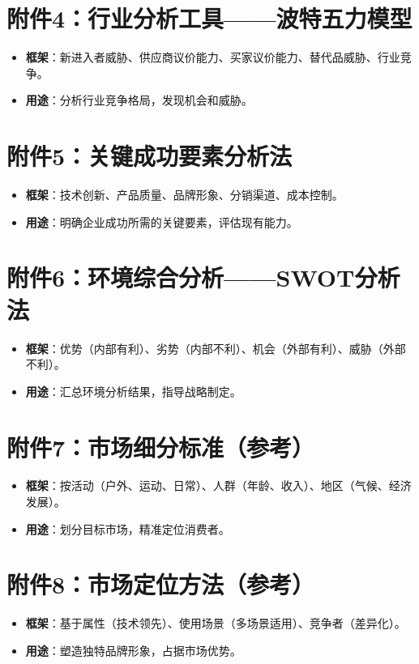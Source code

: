 \documentclass[UTF8]{report}
\theoremstyle{MyLineTheoremStyle} %
\theoremstyle{MyBlockTheoremStyle} %
\theoremstyle{MySubsubsectionStyle} %
\begin{document}
\section{附件4：行业分析工具——波特五力模型}
\begin{itemize}
    \item \textbf{框架}：新进入者威胁、供应商议价能力、买家议价能力、替代品威胁、行业竞争。
    \item \textbf{用途}：分析行业竞争格局，发现机会和威胁。
\end{itemize}

\section{附件5：关键成功要素分析法}
\begin{itemize}
    \item \textbf{框架}：技术创新、产品质量、品牌形象、分销渠道、成本控制。
    \item \textbf{用途}：明确企业成功所需的关键要素，评估现有能力。
\end{itemize}

\section{附件6：环境综合分析——SWOT分析法}
\begin{itemize}
    \item \textbf{框架}：优势（内部有利）、劣势（内部不利）、机会（外部有利）、威胁（外部不利）。
    \item \textbf{用途}：汇总环境分析结果，指导战略制定。
\end{itemize}

\section{附件7：市场细分标准（参考）}
\begin{itemize}
    \item \textbf{框架}：按活动（户外、运动、日常）、人群（年龄、收入）、地区（气候、经济发展）。
    \item \textbf{用途}：划分目标市场，精准定位消费者。
\end{itemize}

\section{附件8：市场定位方法（参考）}
\begin{itemize}
    \item \textbf{框架}：基于属性（技术领先）、使用场景（多场景适用）、竞争者（差异化）。
    \item \textbf{用途}：塑造独特品牌形象，占据市场优势。
\end{itemize}
\end{document}
